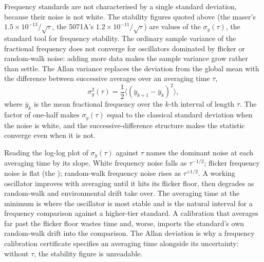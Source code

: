 \begin{mastery}
Frequency standards are not characterised by a single standard
deviation, because their noise is not white. The stability figures
quoted above (the maser's $1.5 \times 10^{-13}/\sqrt{\tau}$, the
5071A's $1.2 \times 10^{-11}/\sqrt{\tau}$) are values of the
 $\sigma_{y}(\tau)$, the standard tool for
frequency stability. The ordinary sample variance of the fractional
frequency does not converge for oscillators dominated by flicker or
random-walk noise: adding more data makes the sample variance grow
rather than settle. The Allan variance replaces the deviation from
the global mean with the difference between successive averages over
an averaging time $\tau$,
\[
\sigma_{y}^{2}(\tau) = \frac{1}{2}
\bigl\langle (\bar{y}_{k+1} - \bar{y}_{k})^{2} \bigr\rangle,
\]
where $\bar{y}_{k}$ is the mean fractional frequency over the $k$-th
interval of length $\tau$. The factor of one-half makes
$\sigma_{y}(\tau)$ equal to the classical standard deviation when the
noise is white, and the successive-difference structure makes the
statistic converge even when it is not.

Reading the log-log plot of $\sigma_{y}(\tau)$ against $\tau$ names
the dominant noise at each averaging time by its slope. White
frequency noise falls as $\tau^{-1/2}$; flicker frequency noise is
flat (the ); random-walk frequency noise rises
as $\tau^{+1/2}$. A working oscillator improves with averaging until
it hits its flicker floor, then degrades as random-walk and
environmental drift take over. The averaging time at the minimum is
where the oscillator is most stable and is the natural interval for a
frequency comparison against a higher-tier standard. A calibration
that averages far past the flicker floor wastes time and, worse,
imports the standard's own random-walk drift into the comparison. The
Allan deviation is why a frequency calibration certificate specifies
an averaging time alongside its uncertainty: without $\tau$, the
stability figure is unreadable.
\end{mastery}

